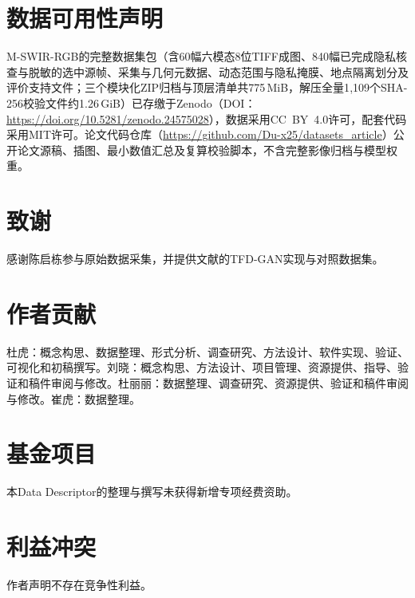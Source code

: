 \documentclass[UTF8,a4paper,10pt]{ctexart}
\begin{document}
\section*{数据可用性声明}
M-SWIR-RGB的完整数据集包\cite{du2026mswirrgb_data}（含60幅六模态8位TIFF成图、840幅已完成隐私核查与脱敏的选中源帧、采集与几何元数据、动态范围与隐私掩膜、地点隔离划分及评价支持文件；三个模块化ZIP归档与顶层清单共775\,MiB，解压全量1{,}109个SHA-256校验文件约1.26\,GiB）已存缴于Zenodo（DOI：\url{https://doi.org/10.5281/zenodo.24575028}），数据采用CC~BY~4.0许可，配套代码采用MIT许可。论文代码仓库（\url{https://github.com/Du-x25/datasets_article}）公开论文源稿、插图、最小数值汇总及复算校验脚本，不含完整影像归档与模型权重。

\section*{致谢}
感谢陈启栋参与原始数据采集，并提供文献\cite{chen2026thesis}的TFD-GAN实现与对照数据集。

\section*{作者贡献}
杜虎：概念构思、数据整理、形式分析、调查研究、方法设计、软件实现、验证、可视化和初稿撰写。刘晓：概念构思、方法设计、项目管理、资源提供、指导、验证和稿件审阅与修改。杜丽丽：数据整理、调查研究、资源提供、验证和稿件审阅与修改。崔虎：数据整理。

\section*{基金项目}
本Data Descriptor的整理与撰写未获得新增专项经费资助。

\section*{利益冲突}
作者声明不存在竞争性利益。

\renewcommand{\bibfont}{\small}
\setlength{\bibsep}{2pt}


\end{document}
